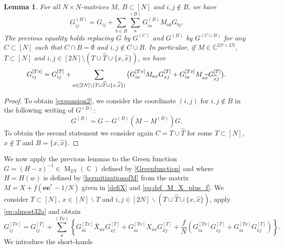 \documentclass[11pt]{article}
\DeclareMathOperator{\CC}{\mathbb{C}}
\DeclareMathOperator{\Mat}{\mathrm{M}}
\newcommand{\C}{\mathbb{C}}
\theoremstyle{plain}
\newtheorem{lemma}{Lemma}[section]
\theoremstyle{remark}
\numberwithin{equation}{section}
\newcommand*\barr[1]{\overline{#1}}
\newcommand*\bset[1]{[#1]}
\newcommand*\ubarr[1]{{\widehat{#1}}}
\newcommand{\nc}{\normalcolor}
\begin{document}
	\begin{lemma}
		For all $N \times N$-matrices $M$, $B \subset [N]$ and $i,j \notin B$, we have
		\begin{equation}\label{expansion2}
			G^{(B)}_{ij} = G_{ij} + \sum_{b \in B }\sum_{a}^{(B)}G^{(B)}_{ia}M_{ab}G_{bj}.
		\end{equation}
		The previous equality holds replacing $G$ by $G^{(C)}$ and $G^{(B)}$ by $G^{(C \cup B)}$ for any $C\subset [N]$ such that $C \cap B = \emptyset$ and $ i,j \notin C \cup B$. In particular, if $M \in \C^{2N\times 2N}$, $T \subset [N]$ and $i,j \in [2N]\setminus (T \cup \ubarr{T} \cup \{ x, \ubarr{x}\})$, 
		we have
		\begin{equation}\label{eq:almost32a}
			G^{\bset{Tx}}_{ij} = G_{ij}^{\bset{T}} + \sum_{ a \in [2N]\setminus (T \cup \ubarr{T} \cup \{ x, \ubarr{x}\})\nc} \big(  G_{ia}^{\bset{Tx}} M_{ax} G_{xj}^{\bset{T}} +  G_{ia}^{\bset{Tx}} M_{a\ubarr{x}} G_{\ubarr{x}j}^{\bset{T}}\big) .
		\end{equation}
		
	\end{lemma}
	\begin{proof}
		To obtain \eqref{expansion2}, we consider the coordinate $(i,j)$ for $i,j \notin B$ in the following writing of $G^{(B)}$:
		\begin{equation*}
			G^{(B)}= G - G^{(B)} \left(M - M^{(B)}\right) G.
		\end{equation*}
		To obtain the second statement we consider again  $C = T \cup \ubarr{T}$ for some $T \subset [N] $, $x \notin T$ and $B = \{x, \ubarr{x}\}$.
	\end{proof}
	We now apply the previous lemmas to the Green function $G= (H-z)^{-1} \in \Mat_{2N}(\CC)$ defined by \cref{Greenfunction} and where $H= H(w)$ is defined by \cref{hermitizationofM} from the matrix $M = X + f(\mathbf{e}\mathbf{e}^\ast - 1/N)$ given in \cref{defiX} and \cref{eq:def_M_X_plus_f}. We consider $T\subset[N]$, $x \in [N]\backslash T$ and $i,j \in [2N]\backslash ( T \cup \ubarr{T} \cup \{x,\ubarr{x}\} )$, apply \cref{eq:almost32a} and obtain
	\begin{equation}\label{eq:32a}
		G_{ij}^{\bset{Tx}} = G_{ij}^{\bset{T}} + \sum_{a}^{(Tx)}\left\{ G_{i\ubarr{a}}^{\bset{Tx}} \barr{X}_{ax}G_{xj}^{\bset{T}}+ G_{ia}^{\bset{Tx}} X_{ax} G_{\ubarr{x}j}^{\bset{T}} + \frac{f}{N} \left(G_{i \ubarr{a}}^{\bset{Tx}} G^{\bset{T}}_{xj} + G_{ia}^{\bset{Tx}} G_{\ubarr{x}j}^{\bset{T}} \right)\right\}.
	\end{equation}
	We introduce the short-hands 
\end{document}

